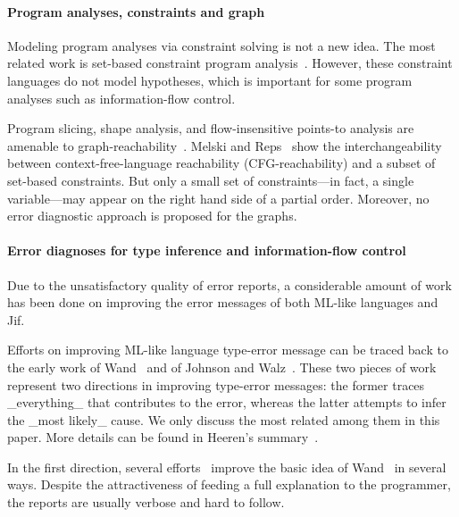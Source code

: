 \paragraph{Program analyses, constraints and graph} 

Modeling program analyses via constraint solving is not a new idea.
The most related work is set-based constraint program
analysis~\cite{aiken-setconstraint, aiken-typeinclusion}.  However,
these constraint languages do not model hypotheses, which is important
for some program analyses such as information-flow control.
 
Program slicing, shape analysis, and flow-insensitive points-to
analysis are amenable to graph-reachability~\cite{reps-graph}. Melski
and Reps~\cite{melski-cflgraph} show the interchangeability between
context-free-language reachability (CFG-reachability) and a subset of
set-based constraints. But only a small set of constraints---in fact,
a single variable---may appear on the right hand side of a partial
order. Moreover, no error diagnostic approach is proposed for the
graphs.

\paragraph{Error diagnoses for type inference
	    and information-flow control} 

Due to the unsatisfactory quality of error reports, a considerable
amount of work has been done on improving the error messages of both
ML-like languages and Jif.

Efforts on improving ML-like language type-error message can be
traced back to the early work of Wand~\cite{wand-errorfinding} and
of Johnson and Walz~\cite{johnson-popl86}. These two pieces of work
represent two directions in improving type-error messages: the former
traces _everything_ that contributes to the error, whereas the
latter attempts to infer the _most likely_ cause. We only discuss the
most related among them in this paper. More details can be found in
Heeren's summary~\cite{heeren:thesis}.

In the first direction, several efforts~\cite{choppella95,
haack:slicing, tip:slicing} improve the basic idea of
Wand~\cite{wand-errorfinding} in several ways. Despite the
attractiveness of feeding a full explanation to the programmer, the
reports are usually verbose and hard to follow.

